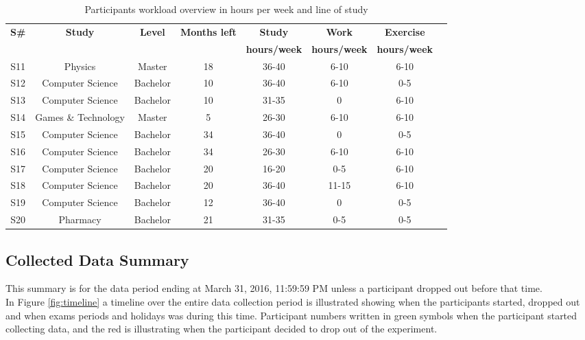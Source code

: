 \documentclass[12pt]{article} %
\begin{document}
\begin{table}[H]
\center
\begin{footnotesize}
	\begin{tabular}{| c | c | c | c | c | c | c | c |}
	\hline
	\textbf{S\#} & \textbf{Study} & \textbf{Level} & \textbf{Months left} & \textbf{Study} & \textbf{Work} & \textbf{Exercise}\\
	 & & & & \textbf{hours/week} & \textbf{hours/week} & \textbf{hours/week}\\
	\hline
	S11 & Physics & Master & 18 & 36-40 & 6-10 & 6-10 \\
	\hline
	S12 & Computer Science & Bachelor & 10 & 36-40 & 6-10 & 0-5\\
	\hline
	S13 & Computer Science & Bachelor & 10 & 31-35 & 0 & 6-10\\
	\hline
	S14 & Games \& Technology & Master & 5 & 26-30 & 6-10 & 6-10\\
	\hline
	S15 & Computer Science & Bachelor & 34 & 36-40 & 0 & 0-5\\
	\hline
	S16 & Computer Science & Bachelor & 34 & 26-30 & 6-10 & 6-10\\
	\hline
	S17 & Computer Science & Bachelor & 20 & 16-20 & 0-5 & 6-10\\
	\hline
	S18 & Computer Science & Bachelor & 20 & 36-40 & 11-15 & 6-10\\
	\hline
	S19 & Computer Science & Bachelor & 12 & 36-40 & 0 & 0-5\\
	\hline
	S20 & Pharmacy & Bachelor & 21 & 31-35 & 0-5 & 0-5\\
	\hline
	\end{tabular}
	\caption{Participants workload overview in hours per week and line of study}
	\label{tab:part1v}
\end{footnotesize}
\end{table}

\subsection{Collected Data Summary}
This summary is for the data period ending at March 31, 2016, 11:59:59 PM unless a participant dropped out before that time. \\

In Figure \ref{fig:timeline} a timeline over the entire data collection period is illustrated showing when the participants started, dropped out and when exams periods and holidays was during this time. Participant numbers written in green symbols when the participant started collecting data, and the red is illustrating when the participant decided to drop out of the experiment. 
\end{document}
